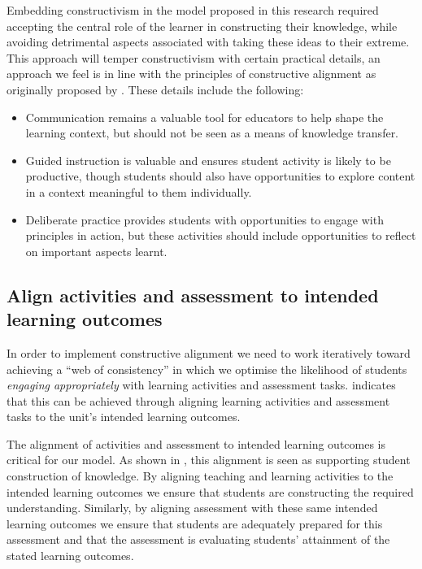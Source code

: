 %
%
% 
%

Embedding constructivism in the model proposed in this research required accepting the central role of the learner in constructing their knowledge, while avoiding detrimental aspects associated with taking these ideas to their extreme. This approach will temper constructivism with certain practical details, an approach we feel is in line with the principles of constructive alignment as originally proposed by \citet{Biggs:1996c}. These details include the following:

\begin{itemize}[noitemsep,nolistsep]
	\item Communication remains a valuable tool for educators to help shape the learning context, but should not be seen as a means of knowledge transfer.
	\item Guided instruction is valuable and ensures student activity is likely to be productive, though students should also have opportunities to explore content in a context meaningful to them individually.
	\item Deliberate practice provides students with opportunities to engage with principles in action, but these activities should include opportunities to reflect on important aspects learnt.
\end{itemize}


\subsection{Align activities and assessment to intended learning outcomes} %
\label{ssub:align_activities_and_assessment_to_intended_learning_outcomes_}

In order to implement constructive alignment we need to work iteratively toward achieving a ``web of consistency'' \cite{Biggs:1999} in which we optimise the likelihood of students \emph{engaging appropriately} with learning activities and assessment tasks. \cite{Biggs:1996c} indicates that this can be achieved through aligning learning activities and assessment tasks to the unit's intended learning outcomes. 

The alignment of activities and assessment to intended learning outcomes is critical for our model. As shown in , this alignment is seen as supporting student construction of knowledge. By aligning teaching and learning activities to the intended learning outcomes we ensure that students are constructing the required understanding. Similarly, by aligning assessment with these same intended learning outcomes we ensure that students are adequately prepared for this assessment and that the assessment is evaluating students' attainment of the stated learning outcomes. 

